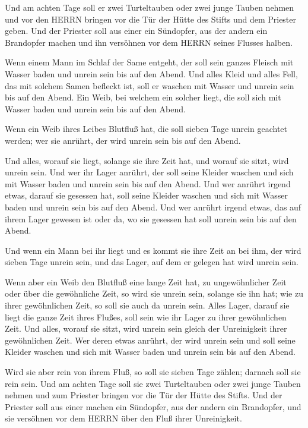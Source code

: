  Und am achten Tage soll er zwei Turteltauben oder zwei
junge Tauben nehmen und vor den HERRN bringen vor die Tür der Hütte des
Stifts und dem Priester geben.  Und der Priester soll aus
einer ein Sündopfer, aus der andern ein Brandopfer machen und ihn
versöhnen vor dem HERRN seines Flusses halben.

 Wenn einem Mann im Schlaf der Same entgeht, der soll sein
ganzes Fleisch mit Wasser baden und unrein sein bis auf den Abend.
 Und alles Kleid und alles Fell, das mit solchem Samen
befleckt ist, soll er waschen mit Wasser und unrein sein bis auf den
Abend.  Ein Weib, bei welchem ein solcher liegt, die soll
sich mit Wasser baden und unrein sein bis auf den Abend.

 Wenn ein Weib ihres Leibes Blutfluß hat, die soll sieben
Tage unrein geachtet werden; wer sie anrührt, der wird unrein sein bis
auf den Abend.

 Und alles, worauf sie liegt, solange sie ihre Zeit hat,
und worauf sie sitzt, wird unrein sein.  Und wer ihr Lager
anrührt, der soll seine Kleider waschen und sich mit Wasser baden und
unrein sein bis auf den Abend.  Und wer anrührt irgend
etwas, darauf sie gesessen hat, soll seine Kleider waschen und sich mit
Wasser baden und unrein sein bis auf den Abend.  Und wer
anrührt irgend etwas, das auf ihrem Lager gewesen ist oder da, wo sie
gesessen hat soll unrein sein bis auf den Abend.

 Und wenn ein Mann bei ihr liegt und es kommt sie ihre Zeit
an bei ihm, der wird sieben Tage unrein sein, und das Lager, auf dem er
gelegen hat wird unrein sein.

 Wenn aber ein Weib den Blutfluß eine lange Zeit hat, zu
ungewöhnlicher Zeit oder über die gewöhnliche Zeit, so wird sie unrein
sein, solange sie ihn hat; wie zu ihrer gewöhnlichen Zeit, so soll sie
auch da unrein sein.  Alles Lager, darauf sie liegt die
ganze Zeit ihres Flußes, soll sein wie ihr Lager zu ihrer gewöhnlichen
Zeit. Und alles, worauf sie sitzt, wird unrein sein gleich der
Unreinigkeit ihrer gewöhnlichen Zeit.  Wer deren etwas
anrührt, der wird unrein sein und soll seine Kleider waschen und sich
mit Wasser baden und unrein sein bis auf den Abend.

 Wird sie aber rein von ihrem Fluß, so soll sie sieben Tage
zählen; darnach soll sie rein sein.  Und am achten Tage
soll sie zwei Turteltauben oder zwei junge Tauben nehmen und zum
Priester bringen vor die Tür der Hütte des Stifts.  Und der
Priester soll aus einer machen ein Sündopfer, aus der andern ein
Brandopfer, und sie versöhnen vor dem HERRN über den Fluß ihrer
Unreinigkeit.

